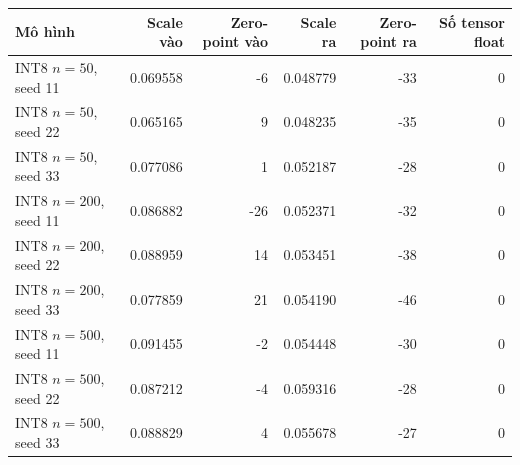 \begin{tabular}{lrrrrr}
\toprule
Mô hình & Scale vào & Zero-point vào & Scale ra & Zero-point ra & Số tensor float \\
\midrule
INT8 $n=50$, seed 11 & 0.069558 & -6 & 0.048779 & -33 & 0 \\
INT8 $n=50$, seed 22 & 0.065165 & 9 & 0.048235 & -35 & 0 \\
INT8 $n=50$, seed 33 & 0.077086 & 1 & 0.052187 & -28 & 0 \\
INT8 $n=200$, seed 11 & 0.086882 & -26 & 0.052371 & -32 & 0 \\
INT8 $n=200$, seed 22 & 0.088959 & 14 & 0.053451 & -38 & 0 \\
INT8 $n=200$, seed 33 & 0.077859 & 21 & 0.054190 & -46 & 0 \\
INT8 $n=500$, seed 11 & 0.091455 & -2 & 0.054448 & -30 & 0 \\
INT8 $n=500$, seed 22 & 0.087212 & -4 & 0.059316 & -28 & 0 \\
INT8 $n=500$, seed 33 & 0.088829 & 4 & 0.055678 & -27 & 0 \\
\bottomrule
\end{tabular}
